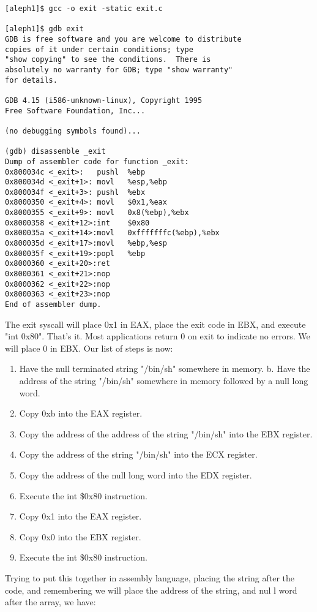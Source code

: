 \documentclass[12pt]{article}
\begin{document}
{\small
\begin{verbatim}
[aleph1]$ gcc -o exit -static exit.c

[aleph1]$ gdb exit
GDB is free software and you are welcome to distribute 
copies of it under certain conditions; type 
"show copying" to see the conditions.  There is 
absolutely no warranty for GDB; type "show warranty" 
for details.

GDB 4.15 (i586-unknown-linux), Copyright 1995 
Free Software Foundation, Inc...

(no debugging symbols found)...

(gdb) disassemble _exit
Dump of assembler code for function _exit:
0x800034c <_exit>:   pushl  %ebp
0x800034d <_exit+1>: movl   %esp,%ebp
0x800034f <_exit+3>: pushl  %ebx
0x8000350 <_exit+4>: movl   $0x1,%eax
0x8000355 <_exit+9>: movl   0x8(%ebp),%ebx
0x8000358 <_exit+12>:int    $0x80
0x800035a <_exit+14>:movl   0xfffffffc(%ebp),%ebx
0x800035d <_exit+17>:movl   %ebp,%esp
0x800035f <_exit+19>:popl   %ebp
0x8000360 <_exit+20>:ret
0x8000361 <_exit+21>:nop
0x8000362 <_exit+22>:nop
0x8000363 <_exit+23>:nop
End of assembler dump.
\end{verbatim}
}
The exit syscall will place 0x1 in EAX, place the exit code in EBX, and execute "int 0x80". That's it. Most 
applications return 0 on exit to indicate no errors. We will place 0 in EBX.  Our list of steps is now: 

\begin{enumerate}
\item Have the null terminated string "/bin/sh" somewhere in memory. b. Have the address of the string "/bin/sh" somewhere in memory followed by a null long word. 
\item Copy 0xb into the EAX register. 
\item Copy the address of the address of the string "/bin/sh" into the EBX register. 
\item Copy the address of the string "/bin/sh" into the ECX register. 
\item Copy the address of the null long word into the EDX register. 
\item Execute the int \$0x80 instruction. 
\item Copy 0x1 into the EAX register. 
\item Copy 0x0 into the EBX register. 
\item Execute the int \$0x80 instruction. 
\end{enumerate}

Trying to put this together in assembly language, placing the string after the code, and remembering we will 
place the address of the string, and nul l word after the array, we have:
\end{document}
